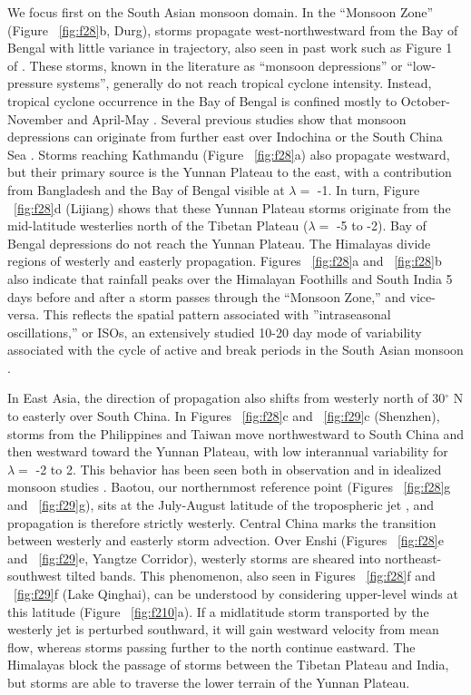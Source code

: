 	 We focus first on the South Asian monsoon domain. In the ``Monsoon Zone'' (Figure ~\ref{fig:f28}b, Durg), storms propagate west-northwestward from the Bay of Bengal with little variance in trajectory, also seen in past work such as Figure 1 of \cite{Sikka1977}. These storms, known in the literature as ``monsoon depressions'' or ``low-pressure systems''\parencite{Sikka1977,Chen1999,Krishnamurthy2010}, generally do not reach tropical cyclone intensity. Instead, tropical cyclone occurrence in the Bay of Bengal is confined mostly to October-November and April-May \parencite{Li2013}. Several previous studies show that monsoon depressions can originate from further east over Indochina or the South China Sea \parencite{Saha1981}. Storms reaching Kathmandu (Figure ~\ref{fig:f28}a) also propagate westward, but their primary source is the Yunnan Plateau to the east, with a contribution from Bangladesh and the Bay of Bengal visible at $\lambda =$ -1. In turn, Figure ~\ref{fig:f28}d (Lijiang) shows that these Yunnan Plateau storms originate from the mid-latitude westerlies north of the Tibetan Plateau ($\lambda =$ -5 to -2). Bay of Bengal depressions do not reach the Yunnan Plateau. The Himalayas divide regions of westerly and easterly propagation. Figures ~\ref{fig:f28}a and ~\ref{fig:f28}b also indicate that rainfall peaks over the Himalayan Foothills and South India 5 days before and after a storm passes through the ``Monsoon Zone,'' and vice-versa. This reflects the spatial pattern associated with ''intraseasonal oscillations,'' or ISOs, an extensively studied 10-20 day mode of variability associated with the cycle of active and break periods in the South Asian monsoon \parencite{Krishnamurti1980,Chen1993,Annamalai2001,Han2006,Fujinami2011,Fujinami2014}.
	 	 
	 In East Asia, the direction of propagation also shifts from westerly north of 30$^{\circ}$ N to easterly over South China. In Figures ~\ref{fig:f28}c and ~\ref{fig:f29}c (Shenzhen), storms from the Philippines and Taiwan move northwestward to South China and then westward toward the Yunnan Plateau, with low interannual variability for $\lambda =$ -2 to 2. This behavior has been seen both in observation \parencite{Chen1999,Liu2003} and in idealized monsoon studies \parencite{Prive2007a}. Baotou, our northernmost reference point (Figures ~\ref{fig:f28}g and ~\ref{fig:f29}g), sits at the July-August latitude of the tropospheric jet \parencite{Schiemann2009}, and propagation is therefore strictly westerly. Central China marks the transition between westerly and easterly storm advection. Over Enshi (Figures ~\ref{fig:f28}e and ~\ref{fig:f29}e, Yangtze Corridor), westerly storms are sheared into northeast-southwest tilted bands. This phenomenon, also seen in Figures ~\ref{fig:f28}f and ~\ref{fig:f29}f (Lake Qinghai), can be understood by considering upper-level winds at this latitude (Figure ~\ref{fig:f210}a). If a midlatitude storm transported by the westerly jet is perturbed southward, it will gain westward velocity from mean flow, whereas storms passing further to the north continue eastward. The Himalayas block the passage of storms between the Tibetan Plateau and India, but storms are able to traverse the lower terrain of the Yunnan Plateau.
	 
